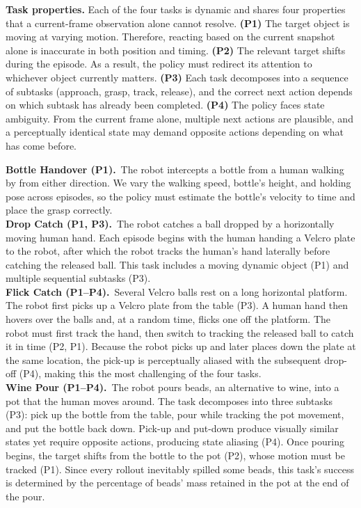\noindent\textbf{Task properties.}\label{sec:task_properties} Each of the four tasks is dynamic and shares four properties that a current-frame observation alone cannot resolve.
  \textbf{(P1)} The target object is moving at varying motion. Therefore, reacting based on the current snapshot alone is inaccurate in both position and timing.
  \textbf{(P2)} The relevant target shifts during the episode. As a result, the policy must redirect its attention to whichever object currently matters.
  \textbf{(P3)} Each task decomposes into a sequence of subtasks (approach, grasp, track, release), and the correct next action depends on which subtask has already been completed.
  \textbf{(P4)} The policy faces state ambiguity. From the current frame alone, multiple next actions are plausible, and a perceptually identical state may demand opposite actions depending on what has come before. 

   
\textbf{Bottle Handover (P1).}~The robot intercepts a bottle from a human walking by from either direction. We vary the walking speed, bottle's height, and holding pose across episodes, so the policy must estimate the bottle's velocity to time and place the grasp correctly.
\\\textbf{Drop Catch (P1, P3).}~The robot catches a ball dropped by a horizontally moving human hand. Each episode begins with the human handing a Velcro plate to the robot, after which the robot tracks the human’s hand laterally before catching the released ball. This task includes a moving dynamic object (P1) and multiple sequential subtasks (P3).
\\\textbf{Flick Catch (P1--P4).}~Several Velcro balls rest on a long horizontal platform. The robot first picks up a Velcro plate from the table (P3). A human hand then hovers over the balls and, at a random time, flicks one off the platform. The robot must first track the hand, then switch to tracking the released ball to catch it in time (P2, P1). Because the robot picks up and later places down the plate at the same location, the pick-up is perceptually aliased with the subsequent drop-off (P4), making this the most challenging of the four tasks.
\\\textbf{Wine Pour (P1--P4).}~The robot pours beads, an alternative to wine, into a pot that the human moves around. The task decomposes into three subtasks (P3): pick up the bottle from the table, pour while tracking the pot movement, and put the bottle back down. Pick-up and put-down produce visually similar states yet require opposite actions, producing state aliasing (P4). Once pouring begins, the target shifts from the bottle to the pot (P2), whose motion must be tracked (P1). Since every rollout inevitably spilled some beads, this task's success is determined by the percentage of beads' mass retained in the pot at the end of the pour.


